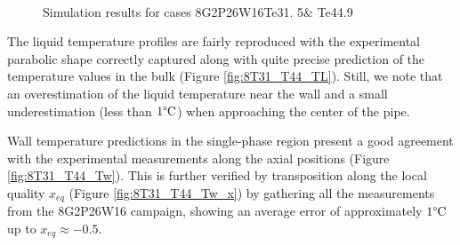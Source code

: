 \begin{figure}[!h]
\centering
{}
\\
\caption{Simulation results for cases 8G2P26W16Te31. 5\& Te44.9}
\label{fig:deb_cfd_8T33_T44}
\end{figure}

\npar

The liquid temperature profiles are fairly reproduced with the experimental parabolic shape correctly captured along with quite precise prediction of the temperature values in the bulk (Figure \ref{fig:8T31_T44_TL}). Still, we note that an overestimation of the liquid temperature near the wall and a small underestimation (less than $1\degree\mathrm{C}$) when approaching the center of the pipe.

\npar

Wall temperature predictions in the single-phase region present a good agreement with the experimental measurements along the axial positions (Figure \ref{fig:8T31_T44_Tw}). This is further verified by transposition along the local quality $x_{eq}$ (Figure \ref{fig:8T31_T44_Tw_x}) by gathering all the measurements from the 8G2P26W16 campaign, showing an average error of approximately $1 \degree\mathrm{C}$ up to $x_{eq} \approx -0.5$.

